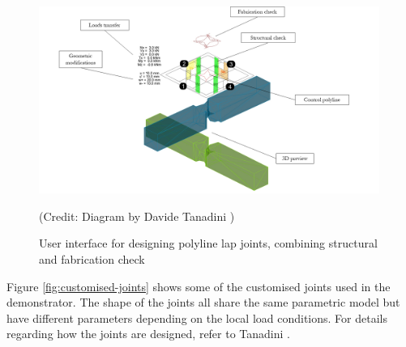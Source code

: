 \begin{figure}[!h]
    \centering
    \includegraphics[width=0.99\textwidth]{images/08/img05.png}
    \caption[User interface for designing polyline lap joints]
    {User interface for designing polyline lap joints, combining structural and fabrication check} {\footnotesize (Credit: Diagram by Davide Tanadini \parencite{tanadiniLimitAnalysisTimber2023})}
    \label{fig:ui-polyline-lap-joint}
\end{figure}


Figure \ref{fig:customised-joints} shows some of the customised joints used in the demonstrator.
The shape of the joints all share the same parametric model but have different parameters depending on the local load conditions. For details regarding how the joints are designed, refer to Tanadini \parencite*{tanadiniLimitAnalysisTimber2023}.

